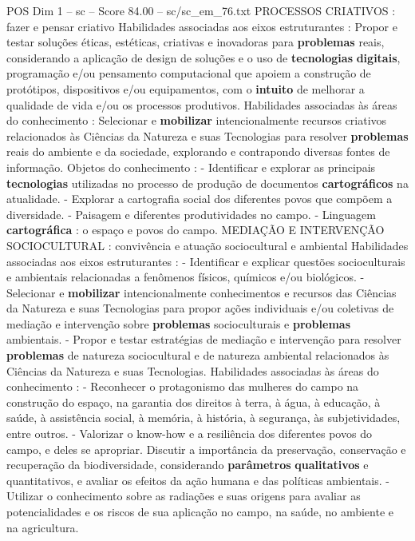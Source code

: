 \begin{textsample}{POS Dim 1 – sc – Score 84.00 – sc/sc\_em\_76.txt}
PROCESSOS CRIATIVOS : fazer e pensar criativo Habilidades associadas aos eixos estruturantes : Propor e testar soluções éticas, estéticas, criativas e inovadoras para \textbf{problemas} reais, considerando a aplicação de design de soluções e o uso de \textbf{tecnologias} \textbf{digitais}, programação e/ou pensamento computacional que apoiem a construção de protótipos, dispositivos e/ou equipamentos, com o \textbf{intuito} de melhorar a qualidade de vida e/ou os processos produtivos.
Habilidades associadas às áreas do conhecimento : Selecionar e \textbf{mobilizar} intencionalmente recursos criativos relacionados às Ciências da Natureza e suas Tecnologias para resolver \textbf{problemas} reais do ambiente e da sociedade, explorando e contrapondo diversas fontes de informação.
Objetos do conhecimento : - Identificar e explorar as principais \textbf{tecnologias} utilizadas no processo de produção de documentos \textbf{cartográficos} na atualidade. - Explorar a cartografia social dos diferentes povos que compõem a diversidade. - Paisagem e diferentes produtividades no campo. - Linguagem \textbf{cartográfica} : o espaço e povos do campo.
MEDIAÇÃO E INTERVENÇÃO SOCIOCULTURAL : convivência e atuação sociocultural e ambiental Habilidades associadas aos eixos estruturantes : - Identificar e explicar questões socioculturais e ambientais relacionadas a fenômenos físicos, químicos e/ou biológicos. - Selecionar e \textbf{mobilizar} intencionalmente conhecimentos e recursos das Ciências da Natureza e suas Tecnologias para propor ações individuais e/ou coletivas de mediação e intervenção sobre \textbf{problemas} socioculturais e \textbf{problemas} ambientais. - Propor e testar estratégias de mediação e intervenção para resolver \textbf{problemas} de natureza sociocultural e de natureza ambiental relacionados às Ciências da Natureza e suas Tecnologias.
Habilidades associadas às áreas do conhecimento : - Reconhecer o protagonismo das mulheres do campo na construção do espaço, na garantia dos direitos à terra, à água, à educação, à saúde, à assistência social, à memória, à história, à segurança, às subjetividades, entre outros. - Valorizar o know-how e a resiliência dos diferentes povos do campo, e deles se apropriar.
Discutir a importância da preservação, conservação e recuperação da biodiversidade, considerando \textbf{parâmetros} \textbf{qualitativos} e quantitativos, e avaliar os efeitos da ação humana e das políticas ambientais. - Utilizar o conhecimento sobre as radiações e suas origens para avaliar as potencialidades e os riscos de sua aplicação no campo, na saúde, no ambiente e na agricultura.

\end{textsample}
